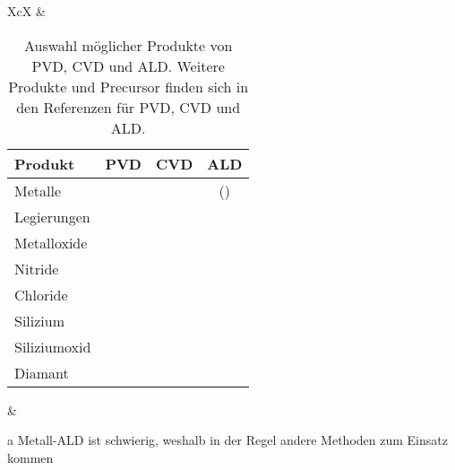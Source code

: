 \begin{table}
  \begin{threeparttable}
    \caption[Auswahl möglicher Produkte von PVD, CVD und ALD]{
      Auswahl möglicher Produkte von PVD, CVD und ALD.
      Weitere Produkte und Precursor finden sich in den Referenzen für PVD\cite{mattox_handbook_2010,helmersson_ionized_2006}, CVD\cite{pierson_handbook_1999} und ALD\cite{puurunen_surface_2005,elliott_atomic-scale_2012}.
    }
    \label{tab:deposition-materials}
    \begin{tabularx}{\textwidth}{XcX}
     & \begin{minipage}[t]{0.55\textwidth}
         \oddrowcolors
         \centering
         \begin{tabular}{|lccc|}
           \hline
           \textbf{Produkt} & \textbf{PVD} & \textbf{CVD} & \textbf{ALD}      \\
           \hline
           Metalle          & \cmark       & \cmark       & (\cmark)\tnote{a} \\
           Legierungen      & \cmark       & \cmark       & ~                 \\
           Metalloxide      & ~            & \cmark       & \cmark            \\
           Nitride          & ~            & \cmark       & \cmark            \\
           Chloride         & ~            & \cmark       & \cmark            \\
           Silizium         & \cmark       & \cmark       & \cmark            \\
           Siliziumoxid     & ~            & \cmark       & \cmark            \\
           Diamant          & ~            & \cmark       & \cmark            \\
           \hline
         \end{tabular}
       \end{minipage}
    & \\
    \end{tabularx}
    \begin{tablenotes}
    \item[a] Metall-ALD ist schwierig, weshalb in der Regel andere Methoden zum Einsatz kommen
    \end{tablenotes}
  \end{threeparttable}
\end{table}

